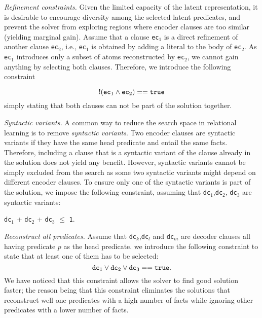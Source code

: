 \textit{Refinement constraints.}
Given the limited capacity of the latent representation, it is desirable to encourage diversity among the selected latent predicates, and prevent the solver from exploring regions where encoder clauses are too similar (yielding marginal gain).
Assume that a clause \texttt{ec}$_1$ is a direct refinement of another clause \texttt{ec}$_2$, i.e., \texttt{ec}$_1$ is obtained by adding a literal to the body of \texttt{ec}$_2$.
As \texttt{ec}$_1$ introduces only a subset of atoms reconstructed by \texttt{ec}$_2$, we cannot gain anything by selecting both clauses.
Therefore, we introduce the following constraint

$$ !(\text{\texttt{ec}}_1 \wedge \text{\texttt{ec}}_2) == \text{\texttt{true}} $$
simply stating that both clauses can not be part of the solution together.



\textit{Syntactic variants.}
A common way to reduce the search space in relational learning is to remove \textit{syntactic variants}.
Two encoder clauses are syntactic variants if they have the same head predicate and entail the same facts.
Therefore, including a clause that is a syntactic variant of the clause already in the solution does not yield any benefit.
However, syntactic variants cannot be simply excluded from the search as some two syntactic variants might depend on different encoder clauses.
To ensure only one of the syntactic variants is part of the solution, we impose the following constraint, assuming that \texttt{dc}$_1$,\texttt{dc}$_2$, \texttt{dc}$_3$ are syntactic variants:

\begin{center}
	\texttt{dc}$_1$ + \texttt{dc}$_2$ + \texttt{dc}$_3$ $\leq$ \texttt{1}.
\end{center}




\textit{Reconstruct all predicates.}
Assume that \texttt{dc}$_k$,\texttt{dc}$_l$ and \texttt{dc}$_m$ are decoder clauses all having predicate $p$ as the head predicate.
we introduce the following constraint to state that at least one of them has to be selected: %
$$ \text{\texttt{dc}}_1 \vee \text{\texttt{dc}}_2 \vee \text{\texttt{dc}}_3 == \text{\texttt{true}}.$$
We have noticed that this constraint allows the solver to find good solution faster; the reason being that this constraint eliminates the solutions that reconstruct well one predicates with a high number of facts while ignoring other predicates with a lower number of facts.



